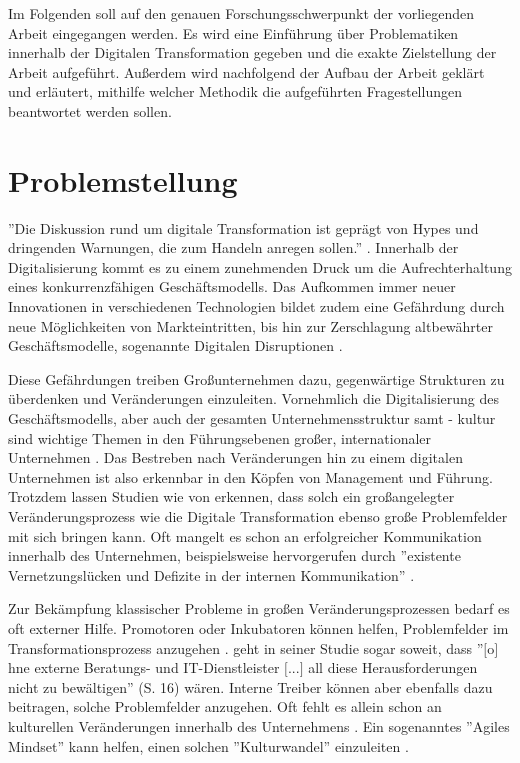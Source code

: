 Im Folgenden soll auf den genauen Forschungsschwerpunkt der vorliegenden Arbeit eingegangen werden. Es wird eine Einführung über Problematiken innerhalb der Digitalen Transformation gegeben und die exakte Zielstellung der Arbeit aufgeführt. Außerdem wird nachfolgend der Aufbau der Arbeit geklärt und erläutert, mithilfe welcher Methodik die aufgeführten Fragestellungen beantwortet werden sollen.

\section{Problemstellung}


''Die Diskussion rund um digitale Transformation ist geprägt von Hypes und dringenden Warnungen, die zum Handeln anregen sollen.'' \cite[S. 12]{berghaus_2016}. Innerhalb der Digitalisierung kommt es zu einem zunehmenden Druck um die Aufrechterhaltung eines konkurrenzfähigen Geschäftsmodells. Das Aufkommen immer neuer Innovationen in verschiedenen Technologien bildet zudem eine Gefährdung durch neue Möglichkeiten von Markteintritten, bis hin zur Zerschlagung altbewährter Geschäftsmodelle, sogenannte Digitalen Disruptionen \cite{urbach_digitalization_2018}.

Diese Gefährdungen treiben Großunternehmen dazu, gegenwärtige Strukturen zu überdenken und Veränderungen einzuleiten.  Vornehmlich die Digitalisierung des Geschäftsmodells, aber auch der gesamten Unternehmensstruktur samt - kultur sind wichtige Themen in den Führungsebenen großer, internationaler Unternehmen \cite[S. 18]{buhse_transformationswerk_2016}. Das Bestreben nach Veränderungen hin zu einem digitalen Unternehmen ist also erkennbar in den Köpfen von Management und Führung. Trotzdem lassen Studien wie von  erkennen, dass solch ein großangelegter Veränderungsprozess wie die Digitale Transformation ebenso große Problemfelder mit sich bringen kann. Oft mangelt es schon an erfolgreicher Kommunikation innerhalb des Unternehmen, beispielsweise hervorgerufen durch ''existente Vernetzungslücken und Defizite in der internen Kommunikation'' \cite[S. 18]{buhse_transformationswerk_2016}.

Zur Bekämpfung klassischer Probleme in großen Veränderungsprozessen bedarf es oft externer Hilfe. Promotoren oder Inkubatoren können helfen, Problemfelder im Transformationsprozess anzugehen . \citeauthor{zillmann_status_2017} geht in seiner Studie sogar soweit, dass ''$\lbrack$o$\rbrack$hne externe Beratungs- und IT-Dienstleister $\lbrack$...$\rbrack$ all diese Herausforderungen nicht zu bewältigen'' (S. 16) wären. Interne Treiber können aber ebenfalls dazu beitragen, solche Problemfelder anzugehen. Oft fehlt es allein schon an kulturellen Veränderungen innerhalb des Unternehmens \cite{hofert_agiler_2016} . Ein sogenanntes ''Agiles Mindset'' kann helfen, einen  solchen ''Kulturwandel'' einzuleiten \cite{hofert_agile_2018}.


